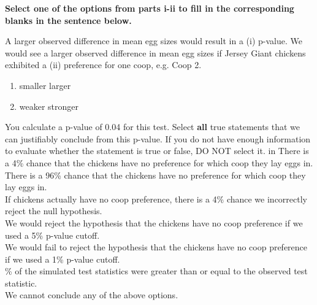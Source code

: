 \begin{enumerate}
 \textbf{Select one of the options from parts i-ii to fill in the corresponding blanks in the sentence below.}

A larger observed difference in mean egg sizes would result in a \underline{\hspace{0.25in}}(i)\underline{\hspace{0.25in}} p-value. We would see a larger observed difference in mean egg sizes if Jersey Giant chickens exhibited a  \underline{\hspace{0.25in}}(ii)\underline{\hspace{0.25in}} preference for one coop, e.g. Coop 2.
\vskip 0.1in
\begin{enumerate}
    \item 
        {\solutionbubble} smaller\hspace{0.25in} {\bubble} larger
    \item
        {\bubble} weaker \hspace{0.25in}{\solutionbubble} stronger
\end{enumerate}

\vskip 0.1in
 You calculate a p-value of 0.04 for this test. Select \textbf{all} true statements that we can justifiably conclude from this p-value. If you do not have enough information to evaluate whether the statement is true or false, DO NOT select it.
 in
\checkbox  There is a 4\% chance that the chickens have no preference for which coop they lay eggs in. \\
\checkbox  There is a 96\% chance that the chickens have no preference for which coop they lay eggs in.\\
\checkbox  If chickens actually have no coop preference, there is a 4\% chance we incorrectly reject the null hypothesis. \\
\solutionbox  We would reject the hypothesis that the chickens have no coop preference if we used a 5\% p-value cutoff.\\
\solutionbox   We would fail to reject the hypothesis that the chickens have no coop preference if we used a 1\% p-value cutoff.\\
\% of the simulated test statistics were greater than or equal to the observed test statistic.\\
\checkbox We cannot conclude any of the above options.

\end{enumerate}
